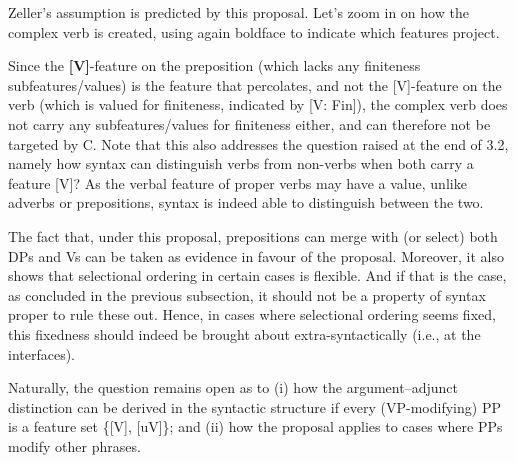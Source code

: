 \documentclass[output=paper
,modfonts
,nonflat]{langsci/langscibook}
\begin{document}
Zeller’s assumption is predicted by this proposal. Let’s zoom in on how the complex verb is created, using again boldface to indicate which features project.

\begin{figure}[!h]
	\begin{exe}
	\end{exe}
\end{figure} 
\noindent Since the \textbf{[V]}-feature on the preposition (which lacks any finiteness subfeatures/values) is the feature that percolates, and not the [V]-feature on the verb (which is valued for finiteness, indicated by [V: Fin]), the complex verb does not carry any subfeatures/values for finiteness either, and can therefore not be targeted by C. Note that this also addresses the question raised at the end of 3.2, namely how syntax can distinguish verbs from non-verbs when both carry a feature [V]? As the verbal feature of proper verbs may have a value, unlike adverbs or prepositions, syntax is indeed able to distinguish between the two.

The fact that, under this proposal, prepositions can merge with (or select) both DPs and Vs can be taken as evidence in favour of the proposal. Moreover, it also shows that selectional ordering in certain cases is flexible. And if that is the case, as concluded in the previous subsection, it should not be a property of syntax proper to rule these out. Hence, in cases where selectional ordering seems fixed, this fixedness should indeed be brought about extra-syntactically (i.e., at the interfaces).

Naturally, the question remains open as to (i) how the argument–adjunct distinction can be derived in the syntactic structure if every (VP-modifying) PP is a feature set \{[V], [uV]\}; and (ii) how the proposal applies to cases where PPs modify other phrases.
\end{document}
